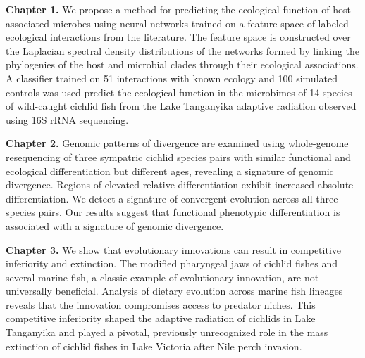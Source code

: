 
\noindent\textbf{Chapter 1.} We propose a method for predicting the ecological function of host-associated
microbes using neural networks trained on a feature space of labeled
ecological interactions from the literature. The feature space is constructed
over the Laplacian spectral density distributions of the networks formed by
linking the phylogenies of the host and microbial clades through their
ecological associations. A classifier trained on 51 interactions with known
ecology and 100 simulated controls was used predict the ecological function in
the microbimes of 14 species of wild-caught cichlid fish from the Lake
Tanganyika adaptive radiation observed using 16S rRNA sequencing.


\noindent\textbf{Chapter 2.} Genomic patterns of divergence are examined using whole-genome resequencing of
three sympatric cichlid species pairs with similar functional and ecological
differentiation but different ages, revealing a signature of genomic
divergence. Regions of
elevated relative differentiation exhibit increased absolute
differentiation. We detect a signature of convergent evolution across all
three species pairs. Our results suggest that functional phenotypic
differentiation is associated with a signature of genomic
divergence.


\noindent\textbf{Chapter 3.} We show that evolutionary innovations can result in competitive inferiority
and extinction. The modified pharyngeal jaws of cichlid fishes and several
marine fish, a classic example of evolutionary innovation, are not
universally beneficial. Analysis of dietary evolution across marine fish
lineages reveals that the innovation compromises access to
predator niches. This competitive inferiority shaped the adaptive
radiation of cichlids in Lake Tanganyika and played a pivotal, previously
unrecognized role in the mass extinction of cichlid fishes in Lake Victoria
after Nile perch invasion.

